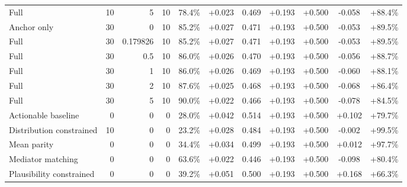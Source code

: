\begin{table}[htbp]
\begin{tabular}{lrrrccccccc}
Full & 10 & 5 & 10 & 78.4\% & +0.023 & 0.469 & +0.193 & +0.500 & -0.058 & +88.4\% \\
Anchor only & 30 & 0 & 10 & 85.2\% & +0.027 & 0.471 & +0.193 & +0.500 & -0.053 & +89.5\% \\
Full & 30 & 0.179826 & 10 & 85.2\% & +0.027 & 0.471 & +0.193 & +0.500 & -0.053 & +89.5\% \\
Full & 30 & 0.5 & 10 & 86.0\% & +0.026 & 0.470 & +0.193 & +0.500 & -0.056 & +88.7\% \\
Full & 30 & 1 & 10 & 86.0\% & +0.026 & 0.469 & +0.193 & +0.500 & -0.060 & +88.1\% \\
Full & 30 & 2 & 10 & 87.6\% & +0.025 & 0.468 & +0.193 & +0.500 & -0.068 & +86.4\% \\
Full & 30 & 5 & 10 & 90.0\% & +0.022 & 0.466 & +0.193 & +0.500 & -0.078 & +84.5\% \\
Actionable baseline & 0 & 0 & 0 & 28.0\% & +0.042 & 0.514 & +0.193 & +0.500 & +0.102 & +79.7\% \\
Distribution constrained & 10 & 0 & 0 & 23.2\% & +0.028 & 0.484 & +0.193 & +0.500 & -0.002 & +99.5\% \\
Mean parity & 0 & 0 & 0 & 34.4\% & +0.034 & 0.499 & +0.193 & +0.500 & +0.012 & +97.7\% \\
Mediator matching & 0 & 0 & 0 & 63.6\% & +0.022 & 0.446 & +0.193 & +0.500 & -0.098 & +80.4\% \\
Plausibility constrained & 0 & 0 & 0 & 39.2\% & +0.051 & 0.500 & +0.193 & +0.500 & +0.168 & +66.3\% \\
\bottomrule
\end{tabular}
\end{table}